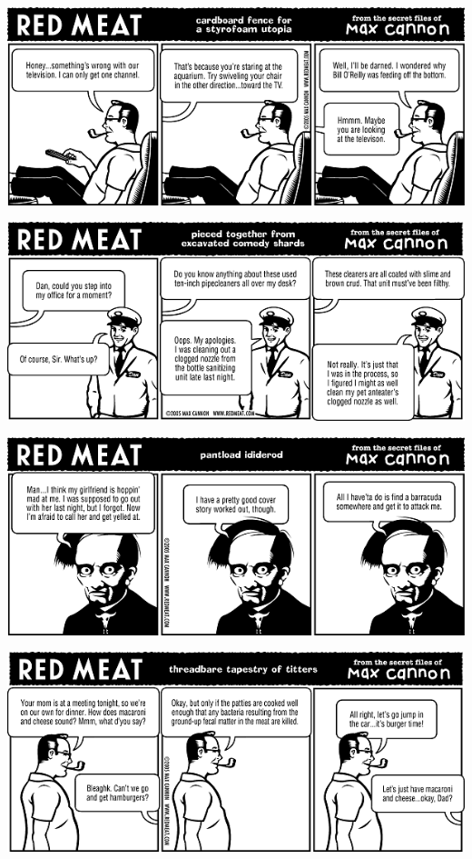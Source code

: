 \documentclass[a4paper,twoside,11pt]{article}
\begin{document}
\includegraphics[width=\textwidth]{redmeat_2005-06-07.png}



\includegraphics[width=\textwidth]{redmeat_2005-06-14.png}



\includegraphics[width=\textwidth]{redmeat_2005-06-21.png}



\includegraphics[width=\textwidth]{redmeat_2005-06-28.png}
\end{document}
